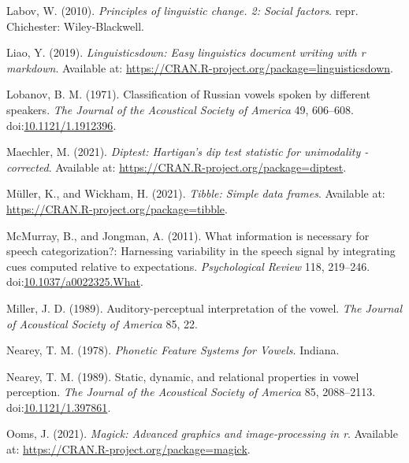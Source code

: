 \documentclass[utf8]{frontiers_suppmat} %
\newlength{\cslhangindent}
\newlength{\cslentryspacingunit} %
\newenvironment{CSLReferences}[2] %
 {%
  \setlength{\parindent}{0pt}
  \ifodd #1
  \let\oldpar\par
  \def\par{\hangindent=\cslhangindent\oldpar}
  \fi
  \setlength{\parskip}{#2\cslentryspacingunit}
 }%
 {}
\begin{document}
\begin{CSLReferences}{1}{0}
\leavevmode{}%
Labov, W. (2010). \emph{Principles of linguistic change. 2: {Social} factors}. repr. {Chichester}: {Wiley-Blackwell}.

\leavevmode{}%
Liao, Y. (2019). \emph{Linguisticsdown: Easy linguistics document writing with r markdown}. Available at: \url{https://CRAN.R-project.org/package=linguisticsdown}.

\leavevmode{}%
Lobanov, B. M. (1971). Classification of {Russian} vowels spoken by different speakers. \emph{The Journal of the Acoustical Society of America} 49, 606--608. doi:\href{https://doi.org/10.1121/1.1912396}{10.1121/1.1912396}.

\leavevmode{}%
Maechler, M. (2021). \emph{Diptest: Hartigan's dip test statistic for unimodality - corrected}. Available at: \url{https://CRAN.R-project.org/package=diptest}.

\leavevmode{}%
Müller, K., and Wickham, H. (2021). \emph{Tibble: Simple data frames}. Available at: \url{https://CRAN.R-project.org/package=tibble}.

\leavevmode{}%
McMurray, B., and Jongman, A. (2011). What information is necessary for speech categorization?: {Harnessing} variability in the speech signal by integrating cues computed relative to expectations. \emph{Psychological Review} 118, 219--246. doi:\href{https://doi.org/10.1037/a0022325.What}{10.1037/a0022325.What}.

\leavevmode{}%
Miller, J. D. (1989). Auditory-perceptual interpretation of the vowel. \emph{The Journal of Acoustical Society of America} 85, 22.

\leavevmode{}%
Nearey, T. M. (1978). \emph{Phonetic {Feature Systems} for {Vowels}}. {Indiana}.

\leavevmode{}%
Nearey, T. M. (1989). Static, dynamic, and relational properties in vowel perception. \emph{The Journal of the Acoustical Society of America} 85, 2088--2113. doi:\href{https://doi.org/10.1121/1.397861}{10.1121/1.397861}.

\leavevmode{}%
Ooms, J. (2021). \emph{Magick: Advanced graphics and image-processing in r}. Available at: \url{https://CRAN.R-project.org/package=magick}.


\end{CSLReferences}
\end{document}

